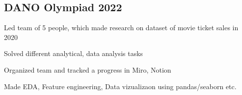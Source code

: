 \documentclass[a4paper,12pt]{article}
\begin{document}
\subsection{{DANO Olympiad }\hfill 2022}
\begin{zitemize}
\item Led team of 5 people, which made research on dataset of
movie ticket sales in 2020
\item Solved different analytical, data analysis tasks
\item Organized team and tracked a progress in Miro, Notion
\item Made EDA, Feature engineering, Data vizualizaon using
pandas/seaborn etc.
\end{zitemize}

\end{document}
